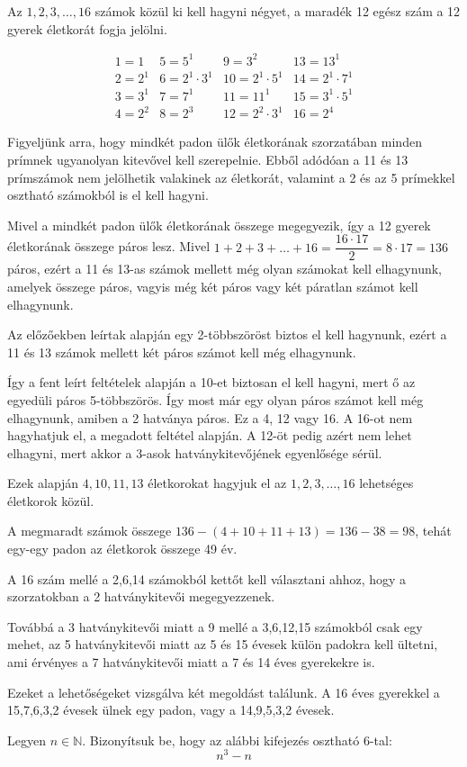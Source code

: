 \begin{solution}
Az $1,2,3,\ldots,16$ számok közül ki kell hagyni négyet, a maradék
12 egész szám a 12 gyerek életkorát fogja jelölni.

\[
\begin{array}{llll}
1=1 & 5=5^{1} & 9=3^{2} & 13=13^{1}\\
2=2^{1} & 6=2^{1}\cdot3^{1} & 10=2^{1}\cdot5^{1} & 14=2^{1}\cdot7^{1}\\
3=3^{1} & 7=7^{1} & 11=11^{1} & 15=3^{1}\cdot5^{1}\\
4=2^{2} & 8=2^{3} & 12=2^{2}\cdot3^{1} & 16=2^{4}
\end{array}
\]

Figyeljünk arra, hogy mindkét padon ülők életkorának szorzatában minden
prímnek ugyanolyan kitevővel kell szerepelnie. Ebből adódóan a 11
és 13 prímszámok nem jelölhetik valakinek az életkorát, valamint a
2 és az 5 prímekkel osztható számokból is el kell hagyni.

Mivel a mindkét padon ülők életkorának összege megegyezik, így a 12
gyerek életkorának összege páros lesz. Mivel $1+2+3+\ldots+16=\dfrac{16\cdot17}{2}=8\cdot17=136$
páros, ezért a 11 és 13-as számok mellett még olyan számokat kell
elhagynunk, amelyek összege páros, vagyis még két páros vagy két páratlan
számot kell elhagynunk.

Az előzőekben leírtak alapján egy 2-többszöröst biztos el kell hagynunk,
ezért a 11 és 13 számok mellett két páros számot kell még elhagynunk.

Így a fent leírt feltételek alapján a 10-et biztosan el kell hagyni,
mert ő az egyedüli páros 5-többszörös. Így most már egy olyan páros
számot kell még elhagynunk, amiben a 2 hatványa páros. Ez a 4, 12
vagy 16. A 16-ot nem hagyhatjuk el, a megadott feltétel alapján. A
12-öt pedig azért nem lehet elhagyni, mert akkor a 3-asok hatványkitevőjének
egyenlősége sérül.

Ezek alapján $4,10,11,13$ életkorokat hagyjuk el az $1,2,3,\ldots,16$
lehetséges életkorok közül.

A megmaradt számok összege $136-(4+10+11+13)=136-38=98$, tehát egy-egy
padon az életkorok összege 49 év.

A 16 szám mellé a 2,6,14 számokból kettőt kell választani ahhoz, hogy
a szorzatokban a 2 hatványkitevői megegyezzenek.

Továbbá a 3 hatványkitevői miatt a 9 mellé a 3,6,12,15 számokból csak
egy mehet, az 5 hatványkitevői miatt az 5 és 15 évesek külön padokra
kell ültetni, ami érvényes a 7 hatványkitevői miatt a 7 és 14 éves
gyerekekre is.

Ezeket a lehetőségeket vizsgálva két megoldást találunk. A 16 éves
gyerekkel a 15,7,6,3,2 évesek ülnek egy padon, vagy a 14,9,5,3,2 évesek. 
\end{solution}
\begin{extraproblem}
Legyen $n\in\mathbb{N}$. Bizonyítsuk be, hogy az alábbi kifejezés
osztható 6-tal: 
\[
n^{3}-n
\]
\end{extraproblem}

